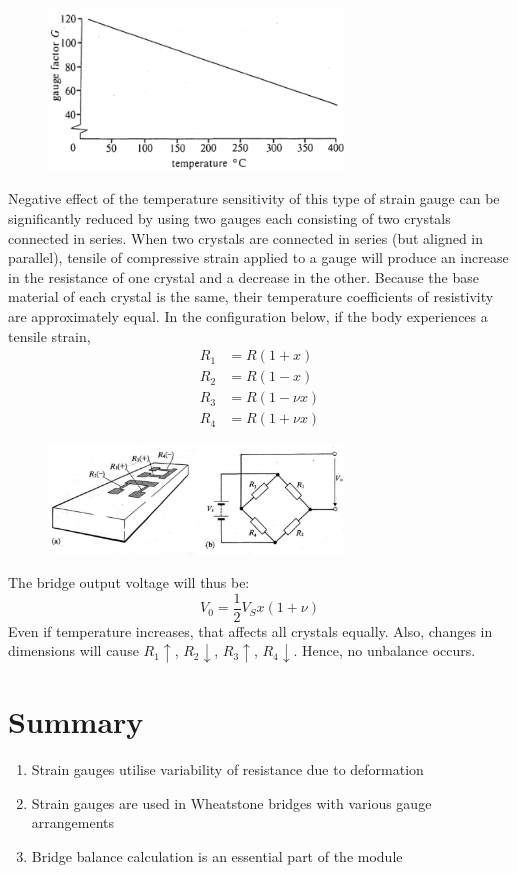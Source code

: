 \documentclass[class=report, crop=false, 12pt,a4paper]{standalone}
\begin{document}
\begin{figure}[H]
  \centering
  \includegraphics[width = 0.7\textwidth]{../img/diagram21.png}
\end{figure}
Negative effect of the temperature sensitivity of this type of strain gauge can be significantly reduced by using two gauges each consisting of two crystals connected in series. When two crystals are connected in series (but aligned in parallel), tensile of compressive strain applied to a gauge will produce an increase in the resistance of one crystal and a decrease in the other. Because the base material of each crystal is the same, their temperature coefficients of resistivity are approximately equal. In the configuration below, if the body experiences a tensile strain,
\begin{align}
  R_1 &= R(1+x)\\
  R_2 &= R(1-x)\\
  R_3 &= R(1-\nu x)\\
  R_4 &= R(1 + \nu x)
\end{align}
\begin{figure}[H]
  \centering
  \includegraphics[width = 0.7\textwidth]{../img/diagram22.png}
\end{figure}
The bridge output voltage will thus be:
\begin{equation}
  V_0 = \frac{1}{2} V_S x (1 + \nu)
\end{equation}
Even if temperature increases, that affects all crystals equally. Also, changes in dimensions will cause $R_1 \uparrow$, $R_2 \downarrow$, $R_3 \uparrow$, $R_4 \downarrow$. Hence, no unbalance occurs. 
\section{Summary}
\begin{enumerate}[noitemsep]
  \item Strain gauges utilise variability of resistance due to deformation
  \item Strain gauges are used in Wheatstone bridges with various gauge arrangements
  \item Bridge balance calculation is an essential part of the module
\end{enumerate}
\end{document}
